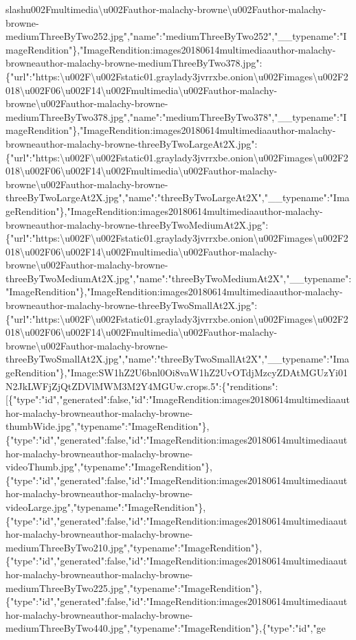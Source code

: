 slash{}u002Fmultimedia\textbackslash{}u002Fauthor-malachy-browne\textbackslash{}u002Fauthor-malachy-browne-mediumThreeByTwo252.jpg","name":"mediumThreeByTwo252","\_\_typename":"ImageRendition"\},"ImageRendition:images20180614multimediaauthor-malachy-browneauthor-malachy-browne-mediumThreeByTwo378.jpg":\{"url":"https:\textbackslash{}u002F\textbackslash{}u002Fstatic01.graylady3jvrrxbe.onion\textbackslash{}u002Fimages\textbackslash{}u002F2018\textbackslash{}u002F06\textbackslash{}u002F14\textbackslash{}u002Fmultimedia\textbackslash{}u002Fauthor-malachy-browne\textbackslash{}u002Fauthor-malachy-browne-mediumThreeByTwo378.jpg","name":"mediumThreeByTwo378","\_\_typename":"ImageRendition"\},"ImageRendition:images20180614multimediaauthor-malachy-browneauthor-malachy-browne-threeByTwoLargeAt2X.jpg":\{"url":"https:\textbackslash{}u002F\textbackslash{}u002Fstatic01.graylady3jvrrxbe.onion\textbackslash{}u002Fimages\textbackslash{}u002F2018\textbackslash{}u002F06\textbackslash{}u002F14\textbackslash{}u002Fmultimedia\textbackslash{}u002Fauthor-malachy-browne\textbackslash{}u002Fauthor-malachy-browne-threeByTwoLargeAt2X.jpg","name":"threeByTwoLargeAt2X","\_\_typename":"ImageRendition"\},"ImageRendition:images20180614multimediaauthor-malachy-browneauthor-malachy-browne-threeByTwoMediumAt2X.jpg":\{"url":"https:\textbackslash{}u002F\textbackslash{}u002Fstatic01.graylady3jvrrxbe.onion\textbackslash{}u002Fimages\textbackslash{}u002F2018\textbackslash{}u002F06\textbackslash{}u002F14\textbackslash{}u002Fmultimedia\textbackslash{}u002Fauthor-malachy-browne\textbackslash{}u002Fauthor-malachy-browne-threeByTwoMediumAt2X.jpg","name":"threeByTwoMediumAt2X","\_\_typename":"ImageRendition"\},"ImageRendition:images20180614multimediaauthor-malachy-browneauthor-malachy-browne-threeByTwoSmallAt2X.jpg":\{"url":"https:\textbackslash{}u002F\textbackslash{}u002Fstatic01.graylady3jvrrxbe.onion\textbackslash{}u002Fimages\textbackslash{}u002F2018\textbackslash{}u002F06\textbackslash{}u002F14\textbackslash{}u002Fmultimedia\textbackslash{}u002Fauthor-malachy-browne\textbackslash{}u002Fauthor-malachy-browne-threeByTwoSmallAt2X.jpg","name":"threeByTwoSmallAt2X","\_\_typename":"ImageRendition"\},"Image:SW1hZ2U6bnl0Oi8vaW1hZ2UvOTdjMzcyZDAtMGUzYi01N2JkLWFjZjQtZDVlMWM3M2Y4MGUw.crops.5":\{"renditions":{[}\{"type":"id","generated":false,"id":"ImageRendition:images20180614multimediaauthor-malachy-browneauthor-malachy-browne-thumbWide.jpg","typename":"ImageRendition"\},\{"type":"id","generated":false,"id":"ImageRendition:images20180614multimediaauthor-malachy-browneauthor-malachy-browne-videoThumb.jpg","typename":"ImageRendition"\},\{"type":"id","generated":false,"id":"ImageRendition:images20180614multimediaauthor-malachy-browneauthor-malachy-browne-videoLarge.jpg","typename":"ImageRendition"\},\{"type":"id","generated":false,"id":"ImageRendition:images20180614multimediaauthor-malachy-browneauthor-malachy-browne-mediumThreeByTwo210.jpg","typename":"ImageRendition"\},\{"type":"id","generated":false,"id":"ImageRendition:images20180614multimediaauthor-malachy-browneauthor-malachy-browne-mediumThreeByTwo225.jpg","typename":"ImageRendition"\},\{"type":"id","generated":false,"id":"ImageRendition:images20180614multimediaauthor-malachy-browneauthor-malachy-browne-mediumThreeByTwo440.jpg","typename":"ImageRendition"\},\{"type":"id","ge